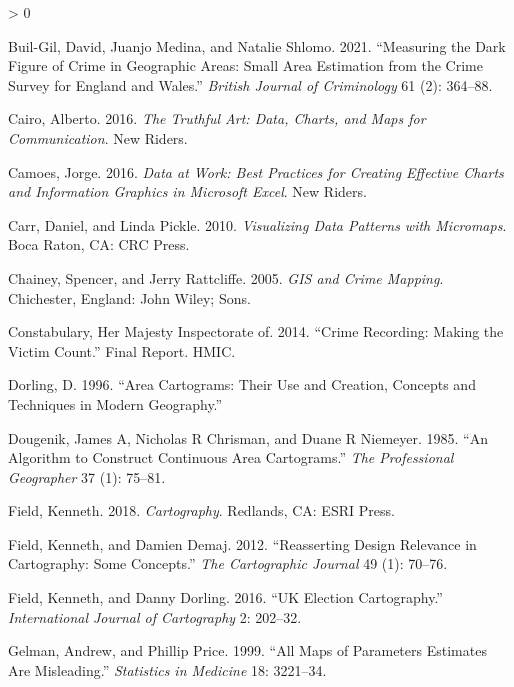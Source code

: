 \documentclass[
]{book}
\newlength{\cslhangindent}
\newenvironment{CSLReferences}[2] %
 {%
  \setlength{\parindent}{0pt}
  \ifodd #1 \everypar{\setlength{\hangindent}{\cslhangindent}}\ignorespaces\fi
  \ifnum #2 > 0
  \setlength{\parskip}{#2\baselineskip}
  \fi
 }%
 {}
\begin{document}
\begin{CSLReferences}{1}{0}
\leavevmode\hypertarget{ref-Buil-Gil_2021}{}%
Buil-Gil, David, Juanjo Medina, and Natalie Shlomo. 2021. {``Measuring the Dark Figure of Crime in Geographic Areas: Small Area Estimation from the Crime Survey for England and Wales.''} \emph{British Journal of Criminology} 61 (2): 364--88.

\leavevmode\hypertarget{ref-Cairo_2016}{}%
Cairo, Alberto. 2016. \emph{The Truthful Art: Data, Charts, and Maps for Communication}. New Riders.

\leavevmode\hypertarget{ref-Camoes_2016}{}%
Camoes, Jorge. 2016. \emph{Data at Work: Best Practices for Creating Effective Charts and Information Graphics in Microsoft Excel}. New Riders.

\leavevmode\hypertarget{ref-Carr_2010}{}%
Carr, Daniel, and Linda Pickle. 2010. \emph{Visualizing Data Patterns with Micromaps}. Boca Raton, CA: CRC Press.

\leavevmode\hypertarget{ref-Chainey_2005}{}%
Chainey, Spencer, and Jerry Rattcliffe. 2005. \emph{GIS and Crime Mapping}. Chichester, England: John Wiley; Sons.

\leavevmode\hypertarget{ref-HMIC_2014}{}%
Constabulary, Her Majesty Inspectorate of. 2014. {``Crime Recording: Making the Victim Count.''} Final Report. HMIC.

\leavevmode\hypertarget{ref-Dorling_1996}{}%
Dorling, D. 1996. {``Area Cartograms: Their Use and Creation, Concepts and Techniques in Modern Geography.''}

\leavevmode\hypertarget{ref-Dougenik_1985}{}%
Dougenik, James A, Nicholas R Chrisman, and Duane R Niemeyer. 1985. {``An Algorithm to Construct Continuous Area Cartograms.''} \emph{The Professional Geographer} 37 (1): 75--81.

\leavevmode\hypertarget{ref-Field_2018}{}%
Field, Kenneth. 2018. \emph{Cartography}. Redlands, CA: ESRI Press.

\leavevmode\hypertarget{ref-Field_2012}{}%
Field, Kenneth, and Damien Demaj. 2012. {``Reasserting Design Relevance in Cartography: Some Concepts.''} \emph{The Cartographic Journal} 49 (1): 70--76.

\leavevmode\hypertarget{ref-Field_2016}{}%
Field, Kenneth, and Danny Dorling. 2016. {``UK Election Cartography.''} \emph{International Journal of Cartography} 2: 202--32.

\leavevmode\hypertarget{ref-Gelman_1999}{}%
Gelman, Andrew, and Phillip Price. 1999. {``All Maps of Parameters Estimates Are Misleading.''} \emph{Statistics in Medicine} 18: 3221--34.


\end{CSLReferences}
\end{document}
